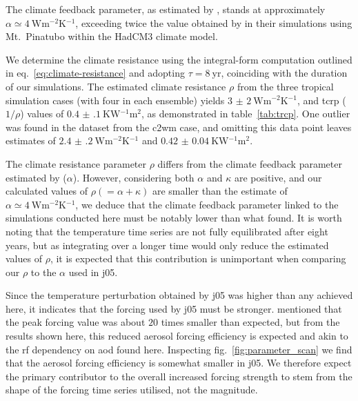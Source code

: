 \documentclass{ametsocV6.1}
\begin{document}
The climate feedback parameter, as estimated by \citet{jones2005}, stands at
approximately \(\alpha \simeq \SI{4}{\watt\metre^{-2}\kelvin^{-1}}\), exceeding twice
the value obtained by \citet{gregory2016} in their simulations using Mt.\ Pinatubo
within the HadCM3 climate model.

We determine the climate resistance using the integral-form computation outlined in
eq.~\ref{eq:climate-resistance} and adopting \(\tau =\SI{8}{\mathrm{yr}}\), coinciding
with the duration of our simulations. The estimated climate resistance \(\rho \) from
the three tropical simulation cases (with four in each ensemble) yields
\(\SI{3(2)}{\watt\metre^{-2}\kelvin^{-1}}\), and \gls{tcrp} (\(1/\rho\)) values of
\(\SI{0.4(1)}{\kelvin\watt^{-1}\metre^{2}}\), as demonstrated in table~\ref{tab:trcp}.
One outlier was found in the dataset from the \gls{c2wm} case, and omitting this data
point leaves estimates of \(\SI{2.4(2)}{\watt\metre^{-2}\kelvin^{-1}}\) and
\(\SI{0.42(4)}{\kelvin\watt^{-1}\metre^{2}}\).

The climate resistance parameter \(\rho\) differs from the climate feedback parameter
estimated by \citet{jones2005} (\(\alpha\)). However, considering both \(\alpha\) and
\(\kappa\) are positive, and our calculated values of \(\rho(=\alpha+\kappa)\) are
smaller than the \citet{jones2005} estimate of \(\alpha \simeq
\SI{4}{\watt\metre^{-2}\kelvin^{-1}}\), we deduce that the climate feedback parameter
linked to the simulations conducted here must be notably lower than what
\citet{jones2005} found. It is worth noting that the temperature time series are not
fully equilibrated after eight years, but as integrating over a longer time would only
reduce the estimated values of \(\rho\), it is expected that this contribution is
unimportant when comparing our \(\rho\) to the \(\alpha\) used in \gls{j05}.

Since the temperature perturbation obtained by \gls{j05} was higher than any achieved
here, it indicates that the forcing used by \gls{j05} must be stronger.
\citet{gregory2016} mentioned that the peak forcing value was about \(20\) times smaller
than expected, but from the results shown here, this reduced aerosol forcing efficiency
is expected and akin to the \gls{rf} dependency on \gls{aod} found here. Inspecting
fig.~\ref{fig:parameter_scan} we find that the aerosol forcing efficiency is somewhat
smaller in \gls{j05}. We therefore expect the primary contributor to the overall
increased forcing strength to stem from the shape of the forcing time series utilised,
not the magnitude.
\end{document}
